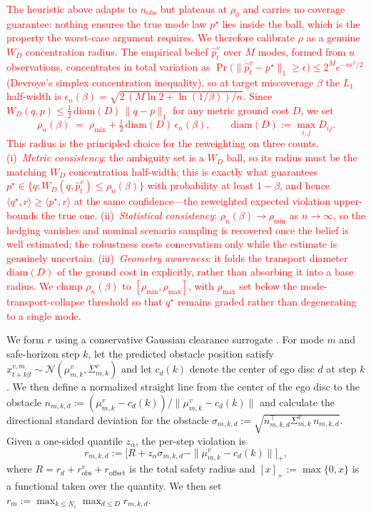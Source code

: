 \documentclass[letterpaper,10pt,conference]{ieeeconf}
\newcommand{\chg}[1]{\textcolor{red}{#1}}
\begin{document}
\chg{The heuristic above adapts to $n_{\mathrm{obs}}$ but plateaus at $\rho_0$ and carries no coverage guarantee: nothing ensures the true mode law $p^\star$ lies inside the ball, which is the property the worst-case argument requires. We therefore calibrate $\rho$ as a genuine $W_D$ concentration radius. The empirical belief $\widehat p_t^v$ over $M$ modes, formed from $n$ observations, concentrates in total variation as $\Pr\!\bigl(\|\widehat p_t^v-p^\star\|_1\ge\epsilon\bigr)\le 2^M e^{-n\epsilon^2/2}$ (Devroye's simplex concentration inequality), so at target miscoverage $\beta$ the $L_1$ half-width is $\epsilon_n(\beta)=\sqrt{2\,(M\ln 2+\ln(1/\beta))/n}$. Since $W_D(q,p)\le\tfrac12\,\mathrm{diam}(D)\,\|q-p\|_1$ for any metric ground cost $D$, we set
\[
\rho_n(\beta)\;=\;\rho_{\min}+\tfrac12\,\mathrm{diam}(D)\,\epsilon_n(\beta),\qquad \mathrm{diam}(D):=\max_{i,j}D_{ij}.
\]
This radius is the principled choice for the reweighting on three counts. (i)~\emph{Metric consistency}: the ambiguity set is a $W_D$ ball, so its radius must be the matching $W_D$ concentration half-width; this is exactly what guarantees $p^\star\in\{q:W_D(q,\widehat p_t^v)\le\rho_n(\beta)\}$ with probability at least $1-\beta$, and hence $\langle q^\star,r\rangle\ge\langle p^\star,r\rangle$ at the same confidence---the reweighted expected violation upper-bounds the true one. (ii)~\emph{Statistical consistency}: $\rho_n(\beta)\to\rho_{\min}$ as $n\to\infty$, so the hedging vanishes and nominal scenario sampling is recovered once the belief is well estimated; the robustness costs conservatism only while the estimate is genuinely uncertain. (iii)~\emph{Geometry awareness}: it folds the transport diameter $\mathrm{diam}(D)$ of the ground cost in explicitly, rather than absorbing it into a base radius. We clamp $\rho_n(\beta)$ to $[\rho_{\min},\rho_{\max}]$, with $\rho_{\max}$ set below the mode-transport-collapse threshold so that $q^\star$ remains graded rather than degenerating to a single mode.}

We form $r$ using a conservative Gaussian clearance surrogate \cite{blackmore2012CCOPPW}. For mode $m$ and safe-horizon step $k$, let the predicted obstacle position satisfy $x_{t+k|t}^{v,m}\sim\mathcal N(\mu_{m,k}^v,\Sigma_{m,k}^v)$ and let $c_d(k)$ denote the center of ego disc $d$ at step $k$.
We then define a normalized straight line from the center of the ego disc to the obstacle $n_{m,k,d}:=(\mu_{m,k}^v-c_d(k))/\|\mu_{m,k}^v-c_d(k)\|$ and calculate the directional standard deviation for the obstacle $\sigma_{m,k,d}:=\sqrt{n_{m,k,d}^\top \Sigma_{m,k}^v\, n_{m,k,d}}$. 
Given a one-sided quantile $z_\alpha$, the per-step violation is
\[
r_{m,k,d} := \bigl[R + z_\alpha \sigma_{m,k,d} - \|\mu_{m,k}^v-c_d(k)\|\bigr]_+,
\]
where $R=r_d+r_{\mathrm{obs}}^v+r_{\mathrm{offset}}$ is the total safety radius and $[x]_+:=\max\{0,x\}$ is a functional taken over the quantity. We then set $r_m := \max_{k\le N_s}\max_{d\le D} r_{m,k,d}$.
\end{document}
